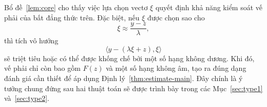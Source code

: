 \begin{essayonly}
Bổ đề~\ref{lem:core} cho thấy việc lựa chọn vectơ $\xi$ quyết định khả năng kiểm soát vế phải của bất đẳng thức trên. Đặc biệt, nếu $\xi$ được chọn sao cho
\[
\xi\approx\frac{y-z}{\lambda},
\]
thì tích vô hướng
\[
\langle y-(\lambda\xi+z),\xi\rangle
\]
sẽ triệt tiêu hoặc có thể được khống chế bởi một số hạng không dương. Khi đó, vế phải chỉ còn bao gồm $F(z)$ và một số hạng không âm, tạo ra đúng dạng đánh giá cần thiết để áp dụng Định lý~\ref{thm:estimate-main}. Đây chính là ý tưởng chung đứng sau hai thuật toán sẽ được trình bày trong các Mục~\ref{sec:type1} và~\ref{sec:type2}.
\end{essayonly}
